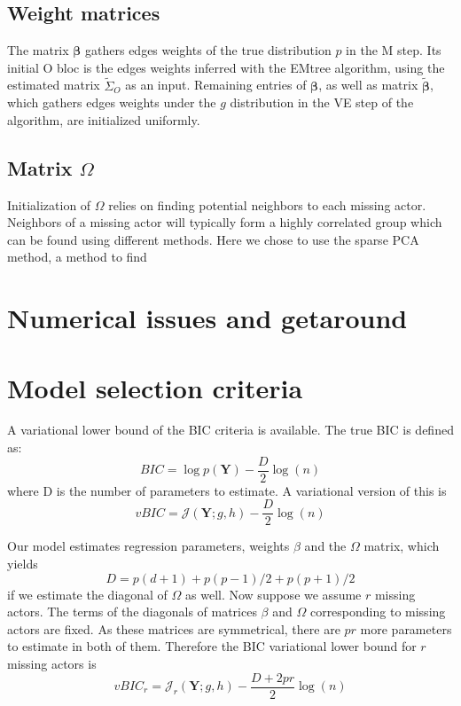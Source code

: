 \documentclass[11pt,a4paper]{article}
\newcommand{\betabf}{\boldsymbol{\beta}}
\newcommand{\Ybf}{\boldsymbol{Y}}
\newcommand{\bound}{\mathcal{J}}
\begin{document}
\subsection{Weight matrices}
 The matrix $\betabf$ gathers edges weights of the true distribution $p$ in the M step.  Its initial O  bloc is the edges weights inferred with the EMtree algorithm, using the estimated matrix $\widetilde{\Sigma}_O$ as an input.  Remaining entries of $\betabf$, as well as matrix $\widetilde{\betabf}$, which gathers edges weights under the $g$ distribution in the VE step of the algorithm, are initialized uniformly.
 
\subsection{Matrix $\Omega$}
Initialization of $\Omega$ relies on finding potential neighbors to each missing actor. Neighbors of a missing actor will typically form a  highly correlated group which can be found using different methods. Here we chose to use the sparse PCA method, a method to find 
\section{Numerical issues and getaround}
\section{Model selection criteria}

A variational lower bound of the BIC criteria is available. The true BIC is defined as:
$$ BIC = \log p(\Ybf) - \frac{D}{2} \log(n) $$
where D is the number of parameters to estimate. A variational version of this is 
$$vBIC = \bound(\Ybf; g,h) - \frac{D}{2} \log(n)  $$

Our model estimates regression parameters, weights $\beta$ and the $\Omega$ matrix, which yields
$$D = p(d+1) + p(p-1)/2 + p(p+1)/2 $$
if we estimate the diagonal of $\Omega$ as well.
Now suppose we assume $r$ missing actors. The terms of the diagonals of matrices $\beta$ and $\Omega$ corresponding to missing actors are fixed. As these matrices are symmetrical,  there are $pr$ more parameters to estimate in both of them. Therefore the BIC variational lower bound for $r$ missing actors is
$$ vBIC_r=\bound_r(\Ybf; g,h) - \frac{D+2pr}{2} \log(n)  $$
 
\newpage

\end{document}
